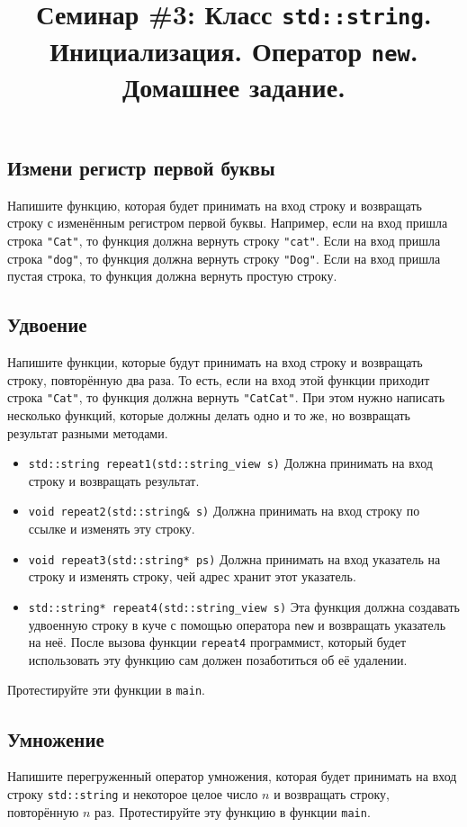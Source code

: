 \documentclass{article}
\begin{document}
\title{Семинар \#3: Класс \texttt{std::string}. Инициализация. Оператор \texttt{new}. Домашнее задание.\vspace{-5ex}}\date{}\maketitle

\subsection{Измени регистр первой буквы}
Напишите функцию, которая будет принимать на вход строку и возвращать строку с изменённым регистром первой буквы. Например, если на вход пришла строка \texttt{"Cat"}, то функция должна вернуть строку \texttt{"cat"}. Если на вход пришла строка \texttt{"dog"}, то функция должна вернуть строку \texttt{"Dog"}. Если на вход пришла пустая строка, то функция должна вернуть простую строку.


\subsection{Удвоение}
Напишите функции, которые будут принимать на вход строку и возвращать строку, повторённую два раза. То есть, если на вход этой функции приходит строка \texttt{"Cat"}, то функция должна вернуть \texttt{"CatCat"}.
При этом нужно написать несколько функций, которые должны делать одно и то же, но возвращать результат разными методами.
\begin{itemize}
\item \texttt{std::string repeat1(std::string\_view s)}
Должна принимать на вход строку и возвращать результат.
\item \texttt{void repeat2(std::string\& s)}
Должна принимать на вход строку по ссылке и изменять эту строку.
\item \texttt{void repeat3(std::string* ps)}
Должна принимать на вход указатель на строку и изменять строку, чей адрес хранит этот указатель.
\item \texttt{std::string* repeat4(std::string\_view s)}
Эта функция должна создавать удвоенную строку в куче с помощью оператора \texttt{new} и возвращать указатель на неё. После вызова функции \texttt{repeat4} программист, который будет использовать эту функцию сам должен позаботиться об её удалении.
\end{itemize}

Протестируйте эти функции в \texttt{main}.

\subsection{Умножение}
Напишите перегруженный оператор умножения, которая будет принимать на вход строку \texttt{std::string} и некоторое целое число $n$ и возвращать строку, повторённую $n$ раз. Протестируйте эту функцию в функции \texttt{main}.
\end{document}
